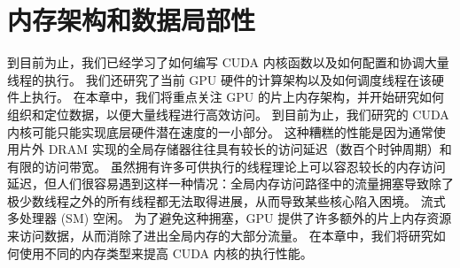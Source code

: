 \section{内存架构和数据局部性}
到目前为止，我们已经学习了如何编写 CUDA 内核函数以及如何配置和协调大量线程的执行。 我们还研究了当前 GPU 硬件的计算架构以及如何调度线程在该硬件上执行。 在本章中，我们将重点关注 GPU 的片上内存架构，并开始研究如何组织和定位数据，以便大量线程进行高效访问。 到目前为止，我们研究的 CUDA 内核可能只能实现底层硬件潜在速度的一小部分。 这种糟糕的性能是因为通常使用片外 DRAM 实现的全局存储器往往具有较长的访问延迟（数百个时钟周期）和有限的访问带宽。 虽然拥有许多可供执行的线程理论上可以容忍较长的内存访问延迟，但人们很容易遇到这样一种情况：全局内存访问路径中的流量拥塞导致除了极少数线程之外的所有线程都无法取得进展，从而导致某些核心陷入困境。 流式多处理器 (SM) 空闲。 为了避免这种拥塞，GPU 提供了许多额外的片上内存资源来访问数据，从而消除了进出全局内存的大部分流量。 在本章中，我们将研究如何使用不同的内存类型来提高 CUDA 内核的执行性能。